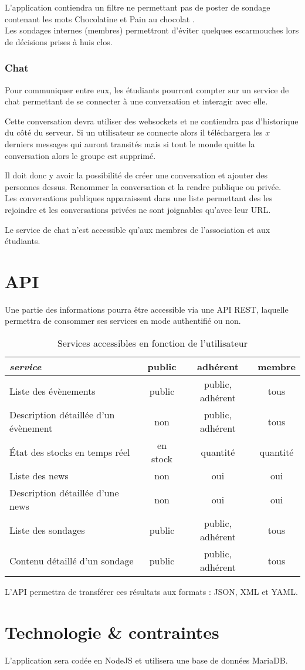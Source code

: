 \documentclass[a4paper,12pt]{article}
\begin{document}
	L'application contiendra un filtre ne permettant pas de poster de sondage contenant les mots \og Chocolatine \fg{} et \og Pain au chocolat \fg{}.\\
Les sondages internes (membres) permettront d'éviter quelques escarmouches lors de décisions prises à huis clos.

\subsubsection{Chat}%
	Pour communiquer entre eux, les étudiants pourront compter sur un service de chat permettant de se connecter à une conversation et interagir avec elle.
	
	Cette conversation devra utiliser des websockets et ne contiendra pas d'historique du côté du serveur. Si un utilisateur se connecte alors il téléchargera les $x$ derniers messages qui auront transités mais si tout le monde quitte la conversation alors le groupe est supprimé.
	
	Il doit donc y avoir la possibilité de créer une conversation et ajouter des personnes dessus. Renommer la conversation et la rendre publique ou privée.\\
Les conversations publiques apparaissent dans une liste permettant des les rejoindre et les conversations privées ne sont joignables qu'avec leur URL.

	Le service de chat n'est accessible qu'aux membres de l'association et aux étudiants.

\section{API}
	Une partie des informations pourra être accessible via une API REST, laquelle permettra de consommer ses services en mode authentifié ou non.
\par
\begin{table}[h]
	\centering
	\caption{Services accessibles en fonction de l'utilisateur}
	\label{my-label}
	\begin{tabular}{|l|c|c|c|}
		\hline
		\textit{\textbf{service}} & \textbf{public} & \textbf{adhérent} & \textbf{membre} \\\hline
		Liste des évènements					& public & public, adhérent & tous \\
		Description détaillée d'un évènement	& non & public, adhérent & tous \\
		État des stocks en temps réel			& en stock & quantité & quantité \\
		Liste des news							& non & oui & oui \\
		Description détaillée d'une news		& non & oui & oui \\
		Liste des sondages						& public & public, adhérent & tous \\
		Contenu détaillé d'un sondage			& public & public, adhérent & tous \\\hline
	\end{tabular}
\end{table}

	L'API permettra de transférer ces résultats aux formats : JSON, XML et YAML.
	
\section{Technologie \& contraintes}
	L'application sera codée en NodeJS et utilisera une base de données MariaDB.
\end{document}
